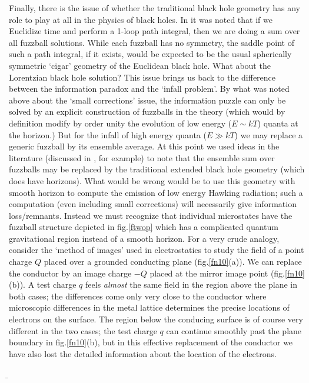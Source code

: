 \documentclass[11pt]{article}
\begin{document}
Finally, there is the issue of whether the traditional black hole geometry has any role to play at all in the physics of black holes. In \cite{phase} it was noted that if we Euclidize time and perform a 1-loop path integral, then we are doing a sum over all fuzzball solutions. While each fuzzball has no symmetry, the saddle point of such a path integral, if it exists, would be expected to be the usual spherically symmetric `cigar' geometry of the Euclidean black hole. What about the Lorentzian black hole solution? This issue brings us back to the difference between the information paradox and the `infall problem'. By what was noted above about the `small corrections' issue, the information puzzle can only be solved by an explicit  construction of fuzzballs in the theory (which would   by definition modify by order unity the evolution of low energy ($E\sim kT$) quanta at the horizon.) But for the infall of high energy quanta ($E\gg kT$) we may replace a generic fuzzball by its ensemble average. At this point we used ideas in the literature (discussed in \cite{israel2,maldacena2,raamsdonk}, for example) to note that the ensemble sum over fuzzballs  may be replaced by the traditional extended black hole geometry (which does have horizons). What would be wrong would be to use this geometry with smooth horizon to compute the emission of low energy Hawking radiation; such a computation (even including small corrections) will necessarily give information loss/remnants. Instead we must recognize that individual microstates have the fuzzball structure depicted in fig.\ref{ftwop} which has a complicated quantum gravitational region  instead of a smooth horizon.  For a very crude analogy, consider the `method of images' used in electrostatics to study the field of a point charge $Q$ placed over a grounded conducting plane (fig.\ref{fn10}(a)). We can replace the conductor by an image charge $-Q$ placed at the mirror image point (fig.\ref{fn10}(b)). A test charge $q$ feels {\it almost} the same field in the region above the plane in both cases; the differences come only very close to the conductor where microscopic differences in the metal lattice determines the precise locations of electrons on the surface. The region below the conducing surface is of course very different in the two cases;  the test charge $q$ can continue smoothly past the plane boundary in fig.\ref{fn10}(b), but in this effective replacement of the conductor we have also lost the detailed information about the location of the electrons.

\b
\end{document}
